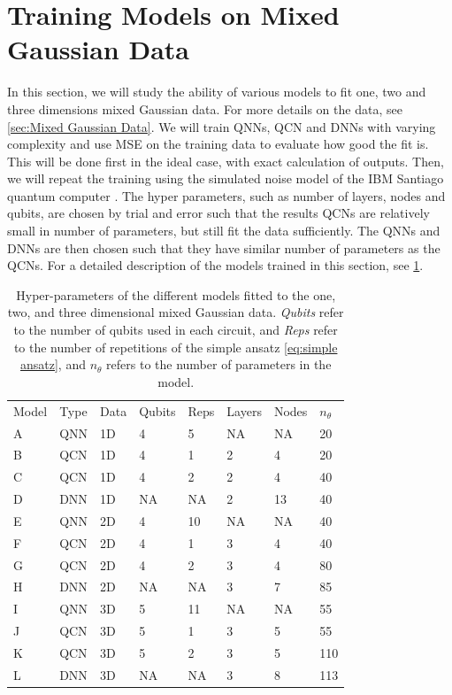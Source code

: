 \section{Training Models on Mixed Gaussian Data}\label{sec:Training Models}
In this section, we will study the ability of various models to fit one, two and three dimensions mixed Gaussian data. For more details on the data, see \cref{sec:Mixed Gaussian Data}. We will train QNNs, QCN and DNNs with varying complexity and use MSE on the training data to evaluate how good the fit is. This will be done first in the ideal case, with exact calculation of outputs. Then, we will repeat the training using the simulated noise model of the IBM Santiago quantum computer \cite{santiago}. The hyper parameters, such as number of layers, nodes and qubits, are chosen by trial and error such that the results QCNs are relatively small in number of parameters, but still fit the data sufficiently. The QNNs and DNNs are then chosen such that they have similar number of parameters as the QCNs.  For a detailed description of the models trained in this section, see \cref{tab:training models}.

\begin{table}[H]
\centering
\caption{Hyper-parameters of the different models fitted to the one, two, and three dimensional mixed Gaussian data. \emph{Qubits} refer to the number of qubits used in each circuit, and \emph{Reps} refer to the number of repetitions of the simple ansatz \cref{eq:simple ansatz}, and $n_{\theta}$ refers to the number of parameters in the model.} 
\begin{tabular}{|l|l|l|l|l|l|l|l|}
\hline
Model& Type& Data& Qubits& Reps& Layers & Nodes &$n_{\theta}$ \\ \Xhline{3\arrayrulewidth}
A    & QNN & 1D  & 4     & 5&NA     & NA& 20   \\ \hline
B    & QCN & 1D  & 4     & 1&2      & 4& 20 \\ \hline
C    & QCN & 1D  & 4     & 2&2      & 4& 40  \\ \hline
D    & DNN & 1D  & NA    & NA&2      & 13& 40  \\ \Xhline{3\arrayrulewidth}
E    & QNN & 2D  & 4     & 10&NA     & NA& 40  \\ \hline
F    & QCN & 2D  & 4     & 1&3      & 4& 40  \\ \hline
G    & QCN & 2D  & 4     & 2&3      & 4& 80  \\ \hline
H    & DNN & 2D  & NA    & NA&3      & 7& 85  \\ \Xhline{3\arrayrulewidth}
I    & QNN & 3D  & 5     & 11&NA     & NA& 55  \\ \hline
J    & QCN & 3D  & 5     & 1&3      & 5& 55  \\ \hline
K    & QCN & 3D  & 5     & 2&3      & 5& 110  \\ \hline
L    & DNN & 3D  & NA    & NA&3      & 8& 113  \\ \hline
\end{tabular}

\label{tab:training models}
\end{table}

